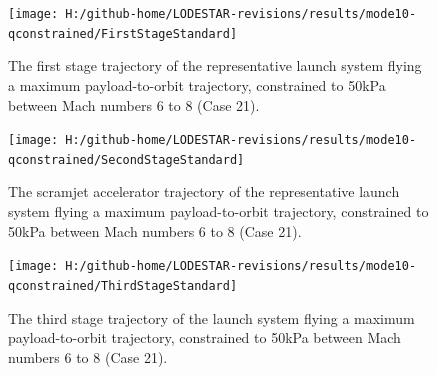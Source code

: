\begin{figure}[!ht]
\centering
\texttt{[image: H:/github-home/LODESTAR-revisions/results/mode10-qconstrained/FirstStageStandard]}
\caption{The first stage trajectory of the representative launch system flying a maximum payload-to-orbit trajectory, constrained to 50kPa between Mach numbers 6 to 8 (Case 21).}
\label{fig:FirstStageqConstrained68}
\end{figure}
\begin{figure}[!ht]
\centering
\texttt{[image: H:/github-home/LODESTAR-revisions/results/mode10-qconstrained/SecondStageStandard]}
\caption{The scramjet accelerator trajectory of the representative launch system flying a maximum payload-to-orbit trajectory, constrained to 50kPa between Mach numbers 6 to 8 (Case 21).}
\label{fig:SecondStageqConstrained68}
\end{figure}
\begin{figure}[!ht]
\centering
\texttt{[image: H:/github-home/LODESTAR-revisions/results/mode10-qconstrained/ThirdStageStandard]}
\caption{The third stage trajectory of the launch system flying a maximum payload-to-orbit trajectory, constrained to 50kPa between Mach numbers 6 to 8 (Case 21).}
\label{fig:ThirdStageqConstrained68}
\end{figure}

\FloatBarrier
